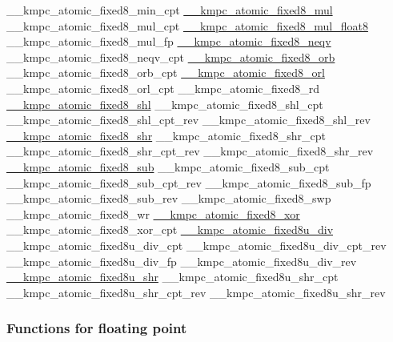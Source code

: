 \begin{DoxyCode}
\_\_kmpc\_atomic\_fixed8\_min\_cpt
\hyperlink{kmp__atomic_8h_af49b13c11c3c994857f64886f2760f7e}{\_\_kmpc\_atomic\_fixed8\_mul}
\_\_kmpc\_atomic\_fixed8\_mul\_cpt
\hyperlink{kmp__atomic_8h_a4e74b2701825780b4cc6ec0b7828c395}{\_\_kmpc\_atomic\_fixed8\_mul\_float8}
\_\_kmpc\_atomic\_fixed8\_mul\_fp
\hyperlink{kmp__atomic_8h_a0027ddb9639bceaf5f5e85a41e719624}{\_\_kmpc\_atomic\_fixed8\_neqv}
\_\_kmpc\_atomic\_fixed8\_neqv\_cpt
\hyperlink{kmp__atomic_8h_a7a22eea6f822219e0efa4e4879a0127a}{\_\_kmpc\_atomic\_fixed8\_orb}
\_\_kmpc\_atomic\_fixed8\_orb\_cpt
\hyperlink{kmp__atomic_8h_ad40cc22147d89d3892f7631ee2177a34}{\_\_kmpc\_atomic\_fixed8\_orl}
\_\_kmpc\_atomic\_fixed8\_orl\_cpt
\_\_kmpc\_atomic\_fixed8\_rd
\hyperlink{kmp__atomic_8h_a8ca3bee7ae9322aa7e1b2187b2d7782f}{\_\_kmpc\_atomic\_fixed8\_shl}
\_\_kmpc\_atomic\_fixed8\_shl\_cpt
\_\_kmpc\_atomic\_fixed8\_shl\_cpt\_rev
\_\_kmpc\_atomic\_fixed8\_shl\_rev
\hyperlink{kmp__atomic_8h_ae836ff943a8fe23b1ccba852becaf121}{\_\_kmpc\_atomic\_fixed8\_shr}
\_\_kmpc\_atomic\_fixed8\_shr\_cpt
\_\_kmpc\_atomic\_fixed8\_shr\_cpt\_rev
\_\_kmpc\_atomic\_fixed8\_shr\_rev
\hyperlink{kmp__atomic_8h_ab7a80feb604c27c37689bfbaebefc720}{\_\_kmpc\_atomic\_fixed8\_sub}
\_\_kmpc\_atomic\_fixed8\_sub\_cpt
\_\_kmpc\_atomic\_fixed8\_sub\_cpt\_rev
\_\_kmpc\_atomic\_fixed8\_sub\_fp
\_\_kmpc\_atomic\_fixed8\_sub\_rev
\_\_kmpc\_atomic\_fixed8\_swp
\_\_kmpc\_atomic\_fixed8\_wr
\hyperlink{kmp__atomic_8h_a5462c195fb7b57c2348aba92593cc1eb}{\_\_kmpc\_atomic\_fixed8\_xor}
\_\_kmpc\_atomic\_fixed8\_xor\_cpt
\hyperlink{kmp__atomic_8h_a969d2072905d38235df1f18a995b5468}{\_\_kmpc\_atomic\_fixed8u\_div}
\_\_kmpc\_atomic\_fixed8u\_div\_cpt
\_\_kmpc\_atomic\_fixed8u\_div\_cpt\_rev
\_\_kmpc\_atomic\_fixed8u\_div\_fp
\_\_kmpc\_atomic\_fixed8u\_div\_rev
\hyperlink{kmp__atomic_8h_a4b2cc40d5a9e65c04db1c2e1e50b58b8}{\_\_kmpc\_atomic\_fixed8u\_shr}
\_\_kmpc\_atomic\_fixed8u\_shr\_cpt
\_\_kmpc\_atomic\_fixed8u\_shr\_cpt\_rev
\_\_kmpc\_atomic\_fixed8u\_shr\_rev
\end{DoxyCode}


\subsubsection*{Functions for floating point }

